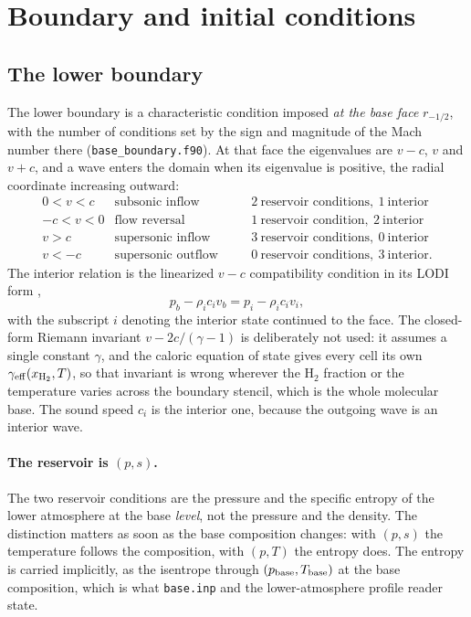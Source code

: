 \section{Boundary and initial conditions}
\label{sec:bcic}

\subsection{The lower boundary}
\label{sec:bcic:base}

The lower boundary is a characteristic condition imposed \emph{at the base
face} $r_{-1/2}$, with the number of conditions set by the sign and magnitude
of the Mach number there (\texttt{base\_boundary.f90}).  At that face the
eigenvalues are $v-c$, $v$ and $v+c$, and a wave enters the domain when its
eigenvalue is positive, the radial coordinate increasing outward:
%
\begin{equation}
  \begin{array}{llcl}
    0 < v < c   &\text{subsonic inflow}      &\quad& 2\ \text{reservoir conditions},\ 1\ \text{interior}\\
    -c < v < 0  &\text{flow reversal}        &\quad& 1\ \text{reservoir condition},\ 2\ \text{interior}\\
    v > c       &\text{supersonic inflow}    &\quad& 3\ \text{reservoir conditions},\ 0\ \text{interior}\\
    v < -c      &\text{supersonic outflow}   &\quad& 0\ \text{reservoir conditions},\ 3\ \text{interior.}
  \end{array}
  \label{eq:base_branches}
\end{equation}
%
The interior relation is the linearized $v-c$ compatibility condition in its
LODI form \citep{Thompson1987, Poinsot1992},
%
\begin{equation}
  p_b - \rho_i c_i v_b = p_i - \rho_i c_i v_i,
  \label{eq:lodi}
\end{equation}
%
with the subscript $i$ denoting the interior state continued to the face.  The
closed-form Riemann invariant $v - 2c/(\gamma-1)$ is deliberately not used: it
assumes a single constant $\gamma$, and the caloric equation of state gives
every cell its own $\gamma_{\rm eff}(x_{\mathrm{H_2}}, T)$, so that invariant
is wrong wherever the $\mathrm{H}_2$ fraction or the temperature varies across
the boundary stencil, which is the whole molecular base.  The sound speed
$c_i$ is the interior one, because the outgoing wave is an interior wave.

\paragraph{The reservoir is $(p,s)$.}
The two reservoir conditions are the pressure and the specific entropy of the
lower atmosphere at the base \emph{level}, not the pressure and the density.
The distinction matters as soon as the base composition changes: with $(p,s)$
the temperature follows the composition, with $(p,T)$ the entropy does.  The
entropy is carried implicitly, as the isentrope through
$(p_{\rm base}, T_{\rm base})$ at the base composition, which is what
\texttt{base.inp} and the lower-atmosphere profile reader state.

